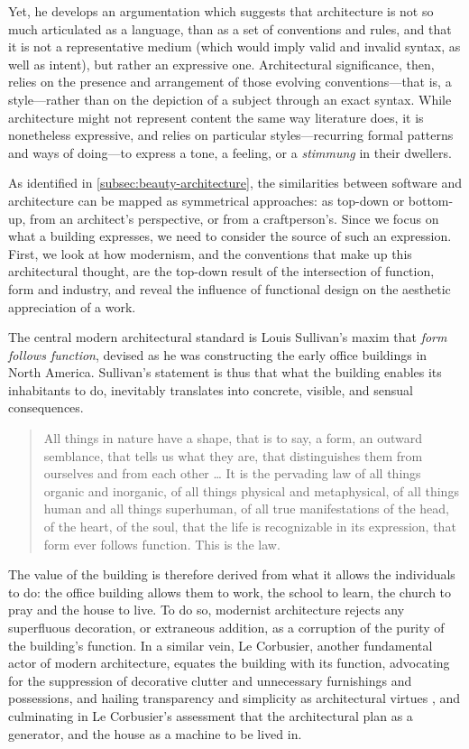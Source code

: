 Yet, he develops an argumentation which suggests that architecture is not so much articulated as a language, than as a set of conventions and rules, and that it is not a representative medium (which would imply valid and invalid syntax, as well as intent), but rather an expressive one. Architectural significance, then, relies on the presence and arrangement of those evolving conventions—that is, a style—rather than on the depiction of a subject through an exact syntax. While architecture might not represent content the same way literature does, it is nonetheless expressive, and relies on particular styles—recurring formal patterns and ways of doing—to express a tone, a feeling, or a \emph{stimmung} in their dwellers.

As identified in \autoref{subsec:beauty-architecture}, the similarities between software and architecture can be mapped as symmetrical approaches: as top-down or bottom-up, from an architect's perspective, or from a craftperson's. Since we focus on what a building expresses, we need to consider the source of such an expression. First, we look at how modernism, and the conventions that make up this architectural thought, are the top-down result of the intersection of function, form and industry, and reveal the influence of functional design on the aesthetic appreciation of a work.

The central modern architectural standard is Louis Sullivan's maxim that \emph{form follows function}, devised as he was constructing the early office buildings in North America. Sullivan's statement is thus that what the building enables its inhabitants to do, inevitably translates into concrete, visible, and sensual consequences.

\begin{quote}
    All things in nature have a shape, that is to say, a form, an outward semblance, that tells us what they are, that distinguishes them from ourselves and from each other
    \dots
    It is the pervading law of all things organic and inorganic, of all things physical and metaphysical, of all things human and all things superhuman, of all true manifestations of the head, of the heart, of the soul, that the life is recognizable in its expression, that form ever follows function. This is the law. \citep{sullivan_tall_1896}
\end{quote}

The value of the building is therefore derived from what it allows the individuals to do: the office building allows them to work, the school to learn, the church to pray and the house to live. To do so, modernist architecture rejects any superfluous decoration, or extraneous addition, as a corruption of the purity of the building's function. In a similar vein, Le Corbusier, another fundamental actor of modern architecture, equates the building with its function, advocating for the suppression of decorative clutter and unnecessary furnishings and possessions, and hailing transparency and simplicity as architectural virtues \citep{lecorbusier_vers_1923}, and culminating in Le Corbusier's assessment that the architectural plan as a generator, and the house as a machine to be lived in.

